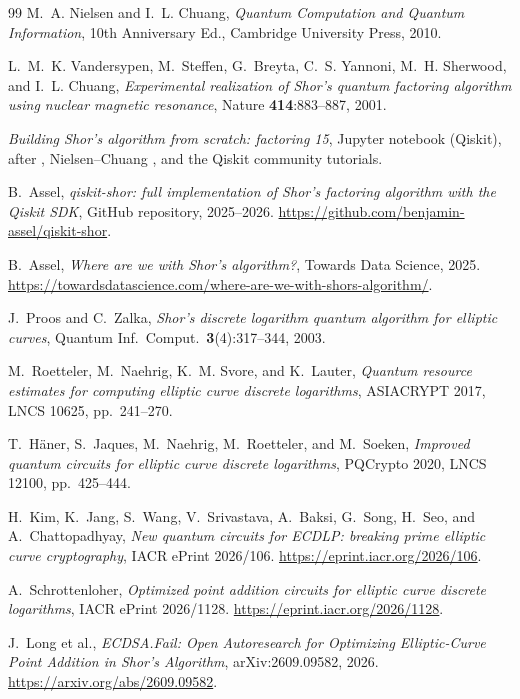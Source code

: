 \documentclass[11pt]{article}
\theoremstyle{plain}
\theoremstyle{remark}
\begin{document}
\begin{thebibliography}{99}
M.~A. Nielsen and I.~L. Chuang,
\emph{Quantum Computation and Quantum Information},
10th Anniversary Ed., Cambridge University Press, 2010.

L.~M.~K. Vandersypen, M.~Steffen, G.~Breyta, C.~S. Yannoni, M.~H. Sherwood, and I.~L. Chuang,
\emph{Experimental realization of Shor's quantum factoring algorithm using nuclear magnetic
resonance},
Nature \textbf{414}:883--887, 2001.

\emph{Building Shor's algorithm from scratch: factoring 15},
Jupyter notebook (Qiskit), after \cite{draper,beauregard}, Nielsen--Chuang
\cite{nielsen-chuang}, and the Qiskit community tutorials.

B.~Assel,
\emph{qiskit-shor: full implementation of Shor's factoring algorithm with the Qiskit SDK},
GitHub repository, 2025--2026.
\url{https://github.com/benjamin-assel/qiskit-shor}.

B.~Assel,
\emph{Where are we with Shor's algorithm?},
Towards Data Science, 2025.
\url{https://towardsdatascience.com/where-are-we-with-shors-algorithm/}.


J.~Proos and C.~Zalka,
\emph{Shor's discrete logarithm quantum algorithm for elliptic curves},
Quantum Inf.\ Comput.\ \textbf{3}(4):317--344, 2003.

M.~Roetteler, M.~Naehrig, K.~M. Svore, and K.~Lauter,
\emph{Quantum resource estimates for computing elliptic curve discrete logarithms},
ASIACRYPT 2017, LNCS 10625, pp.~241--270.

T.~H\"aner, S.~Jaques, M.~Naehrig, M.~Roetteler, and M.~Soeken,
\emph{Improved quantum circuits for elliptic curve discrete logarithms},
PQCrypto 2020, LNCS 12100, pp.~425--444.

H.~Kim, K.~Jang, S.~Wang, V.~Srivastava, A.~Baksi, G.~Song, H.~Seo, and A.~Chattopadhyay,
\emph{New quantum circuits for ECDLP: breaking prime elliptic curve cryptography},
IACR ePrint 2026/106.
\url{https://eprint.iacr.org/2026/106}.

A.~Schrottenloher,
\emph{Optimized point addition circuits for elliptic curve discrete logarithms},
IACR ePrint 2026/1128.
\url{https://eprint.iacr.org/2026/1128}.

J.~Long et al.,
\emph{ECDSA.Fail: Open Autoresearch for Optimizing Elliptic-Curve Point Addition in Shor's Algorithm},
arXiv:2609.09582, 2026.
\url{https://arxiv.org/abs/2609.09582}.


\end{thebibliography}
\end{document}
